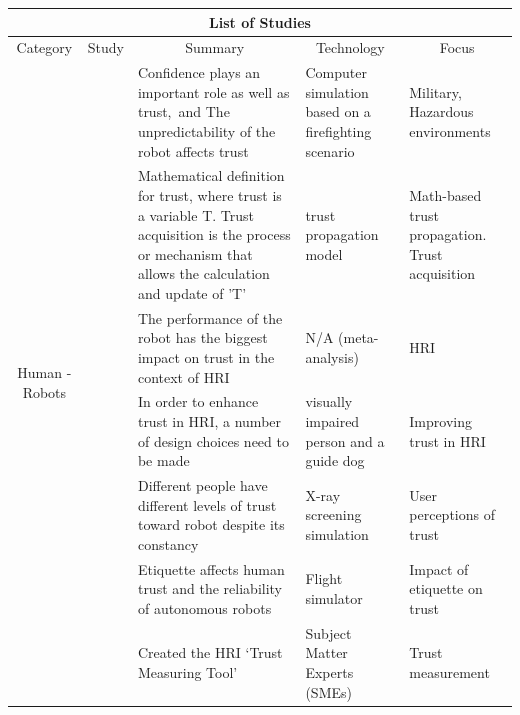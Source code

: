 \documentclass[runningheads,a4paper]{llncs}
\begin{document}
\begin{center}
\setlength\LTleft{0pt}
\setlength\LTright{0pt}
\begin{longtable}{|c|c|p{4cm}|p{2cm}|p{2cm}|}
\hline
\multicolumn{5}{|c|}{List of Studies}                                                                                               \\ \hline
Category                        & Study & \multicolumn{1}{c|}{Summary}    & \multicolumn{1}{c|}{Technology} & \multicolumn{1}{c|}{Focus} \\ \hline
\multirow{8}{*}{Human - Robots} 
    & \cite{stormont2008analyzing}    
    &  Confidence plays an important role as well as trust,\ and The unpredictability of the robot affects trust  
    & Computer simulation based on a firefighting scenario                        
    & Military, Hazardous environments
    \\ \cline{2-5} 
    & \cite{esfandiari2001agents}     
    & Mathematical definition for trust, where trust is a variable T. Trust acquisition is the process or mechanism that allows the calculation and update of 'T'
    & trust propagation model                      
    & Math-based trust propagation. Trust acquisition
    \\ \cline{2-5} 
    & \cite{hancock2011meta}
    & The performance of the robot has the biggest impact on trust in the context of HRI
    & N/A (meta-analysis)
    & HRI
    \\ \cline{2-5}
    &  \cite{penders2013enhancing}
    & In order to enhance trust in HRI, a number of design choices need to be made
    & visually impaired person and a guide dog
    & Improving trust in HRI
    \\ \cline{2-5} 
    & \cite{merritt2008not}
    & Different people have different levels of trust toward robot despite its constancy
    & X-ray screening simulation             
    & User perceptions of trust
    \\ \cline{2-5} 
    & \cite{parasuraman2004trust}
    & Etiquette affects human trust and the reliability of autonomous robots
    & Flight simulator
    & Impact of etiquette on trust
    \\ \cline{2-5} 
    & \cite{yagoda2012you}
    & Created the HRI `Trust Measuring Tool'
    & Subject Matter Experts (SMEs)                
    & Trust measurement

\end{longtable}
\end{center}
\end{document}
